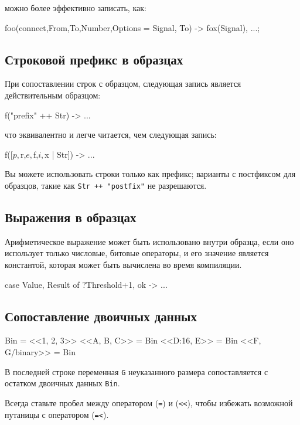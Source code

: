 можно более эффективно записать, как:

\begin{erlang}
foo({connect,From,To,Number,Options} = Signal, To) ->
    fox(Signal),
    ...;
\end{erlang}


\subsection{Строковой префикс в образцах}

При сопоставлении строк с образцом, следующая запись является действительным 
образцом:

\begin{erlang}
f("prefix" ++ Str) -> ...
\end{erlang}

что эквивалентно и легче читается, чем следующая запись:

\begin{erlang}
f([$p,$r,$e,$f,$i,$x | Str]) -> ...
\end{erlang}

Вы можете использовать строки только как префикс; варианты с постфиксом для 
образцов, такие как \texttt{Str ++ "postfix"} не разрешаются. 


\subsection{Выражения в образцах}

Арифметическое выражение может быть использовано внутри образца, если оно 
использует только числовые, битовые операторы, и его значение является 
константой, которая может быть вычислена во время компиляции.

\begin{erlang}
case {Value, Result} of
    {?Threshold+1, ok} -> ...   %
\end{erlang}


\subsection{Сопоставление двоичных данных}

\begin{erlang}
Bin = <<1, 2, 3>>      %
<<A, B, C>> = Bin      %
<<D:16, E>> = Bin      %
<<F, G/binary>> = Bin  %
\end{erlang}

В последней строке переменная \texttt{G} неуказанного размера сопоставляется с 
остатком двоичных данных \texttt{Bin}.

Всегда ставьте пробел между оператором (\texttt{=}) и (\verb|<<|), чтобы 
избежать возможной путаницы с оператором (\texttt{=<}).

